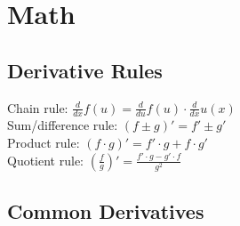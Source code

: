 \section{Math}
\subsection*{Derivative Rules}
Chain rule: $\frac{d}{dx} f(u) = \frac{d}{du} f(u) \cdot \frac{d}{dx} u(x)$\\
Sum/difference rule: $(f \pm g)' = f' \pm g'$\\
Product rule: $(f \cdot g)' = f' \cdot g + f \cdot g'$\\
Quotient rule: $(\frac{f}{g})' = \frac{f' \cdot g - g' \cdot f}{g^2}$\\
\subsection*{Common Derivatives}
 
 

